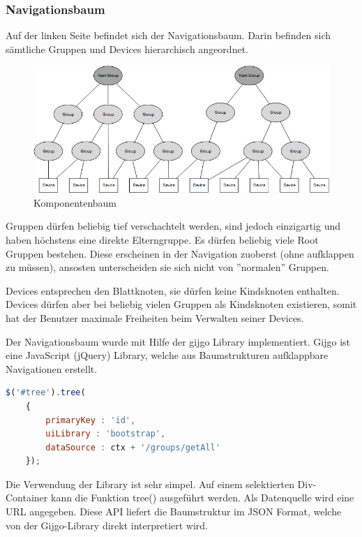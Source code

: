 \subsubsection{Navigationsbaum}
Auf der linken Seite befindet sich der Navigationsbaum. Darin befinden sich sämtliche Gruppen und Devices hierarchisch angeordnet. 

\begin{figure}[H]
\centering
\includegraphics[scale=0.84]{../04_Realisierung/images/userinterface/componentstree.png}
\caption{Komponentenbaum}
\end{figure}

Gruppen dürfen beliebig tief verschachtelt werden, sind jedoch einzigartig und haben höchstens eine direkte Elterngruppe. Es dürfen beliebig viele Root Gruppen bestehen. Diese erscheinen in der Navigation zuoberst (ohne aufklappen zu müssen), ansosten unterscheiden sie sich nicht von ''normalen'' Gruppen. 

Devices entsprechen den Blattknoten, sie dürfen keine Kindsknoten enthalten. Devices dürfen aber bei beliebig vielen Gruppen als Kindsknoten existieren, somit hat der Benutzer maximale Freiheiten beim Verwalten seiner Devices.

Der Navigationsbaum wurde mit Hilfe der gijgo Library implementiert. Gijgo ist eine JavaScript (jQuery) Library, welche aus Baumstrukturen aufklappbare Navigationen erstellt.

\begin{lstlisting}[language=js]
$('#tree').tree(
	{
		primaryKey : 'id',
		uiLibrary : 'bootstrap',
		dataSource : ctx + '/groups/getAll'
	});
\end{lstlisting}

Die Verwendung der Library ist sehr simpel. Auf einem selektierten Div-Container kann die Funktion tree() ausgeführt werden. Als Datenquelle wird eine URL angegeben. Diese API liefert die Baumstruktur im JSON Format, welche von der Gijgo-Library direkt interpretiert wird.
 \newpage

